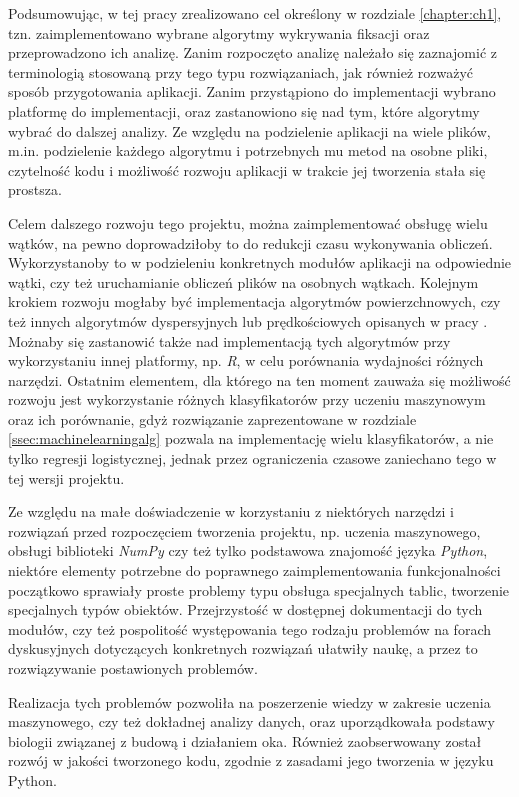 Podsumowując, w tej pracy zrealizowano cel określony w rozdziale \ref{chapter:ch1}, tzn. zaimplementowano wybrane algorytmy wykrywania fiksacji oraz przeprowadzono ich analizę. Zanim rozpoczęto analizę należało się zaznajomić z terminologią stosowaną przy tego typu rozwiązaniach, jak również rozważyć sposób przygotowania aplikacji. Zanim przystąpiono do implementacji wybrano platformę do implementacji, oraz zastanowiono się nad tym, które algorytmy wybrać do dalszej analizy. Ze względu na podzielenie aplikacji na wiele plików, m.in. podzielenie każdego algorytmu i potrzebnych mu metod na osobne pliki, czytelność kodu i możliwość rozwoju aplikacji w trakcie jej tworzenia stała się prostsza.\par
Celem dalszego rozwoju tego projektu, można zaimplementować obsługę wielu wątków, na pewno doprowadziłoby to do redukcji czasu wykonywania obliczeń. Wykorzystanoby to w podzieleniu konkretnych modułów aplikacji na odpowiednie wątki, czy też uruchamianie obliczeń plików na osobnych wątkach. Kolejnym krokiem rozwoju mogłaby być implementacja algorytmów powierzchnowych, czy też innych algorytmów dyspersyjnych lub prędkościowych opisanych w pracy \cite{Main}. Możnaby się zastanowić także nad implementacją tych algorytmów przy wykorzystaniu innej platformy, np. \emph{R}, w celu porównania wydajności różnych narzędzi. Ostatnim elementem, dla którego na ten moment zauważa się możliwość rozwoju jest wykorzystanie różnych klasyfikatorów przy uczeniu maszynowym oraz ich porównanie, gdyż rozwiązanie zaprezentowane w rozdziale \ref{ssec:machinelearningalg} pozwala na implementację wielu klasyfikatorów, a nie tylko regresji logistycznej, jednak przez ograniczenia czasowe zaniechano tego w tej wersji projektu.\par
Ze względu na małe doświadczenie w korzystaniu z niektórych narzędzi i rozwiązań przed rozpoczęciem tworzenia projektu, np. uczenia maszynowego, obsługi biblioteki \emph{NumPy} czy też tylko podstawowa znajomość języka \emph{Python}, niektóre elementy potrzebne do poprawnego zaimplementowania funkcjonalności początkowo sprawiały proste problemy typu obsługa specjalnych tablic, tworzenie specjalnych typów obiektów. Przejrzystość w dostępnej dokumentacji do tych modułów, czy też pospolitość występowania tego rodzaju problemów na forach dyskusyjnych dotyczących konkretnych rozwiązań ułatwiły naukę, a przez to rozwiązywanie postawionych problemów.\par
Realizacja tych problemów pozwoliła na poszerzenie wiedzy w zakresie uczenia maszynowego, czy też dokładnej analizy danych, oraz uporządkowała podstawy biologii związanej z budową i działaniem oka. Również zaobserwowany został rozwój w jakości tworzonego kodu, zgodnie z zasadami jego tworzenia w języku Python.